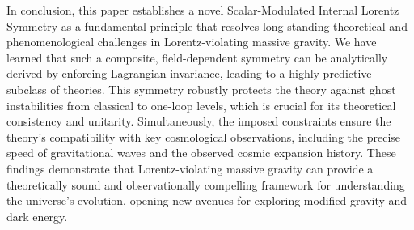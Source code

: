 \documentclass[twocolumn]{aastex631}
\begin{document}
In conclusion, this paper establishes a novel Scalar-Modulated Internal Lorentz Symmetry as a fundamental principle that resolves long-standing theoretical and phenomenological challenges in Lorentz-violating massive gravity. We have learned that such a composite, field-dependent symmetry can be analytically derived by enforcing Lagrangian invariance, leading to a highly predictive subclass of theories. This symmetry robustly protects the theory against ghost instabilities from classical to one-loop levels, which is crucial for its theoretical consistency and unitarity. Simultaneously, the imposed constraints ensure the theory's compatibility with key cosmological observations, including the precise speed of gravitational waves and the observed cosmic expansion history. These findings demonstrate that Lorentz-violating massive gravity can provide a theoretically sound and observationally compelling framework for understanding the universe's evolution, opening new avenues for exploring modified gravity and dark energy.

{}

\end{document}
